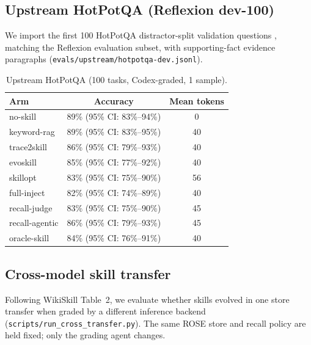 \documentclass[11pt]{article}
\begin{document}
\subsection{Upstream HotPotQA (Reflexion dev-100)}
\label{sec:hotpot}

We import the first 100 HotPotQA distractor-split validation questions \citep{yang2018hotpotqa}, matching the Reflexion evaluation subset, with supporting-fact evidence paragraphs (\texttt{evals/upstream/hotpotqa-dev.jsonl}).

\begin{table}[t]
  \centering
  \caption{Upstream HotPotQA (100 tasks, Codex-graded, 1 sample).}
  \label{tab:hotpot_upstream}
  \begin{tabular}{lcc}
    \toprule
    Arm & Accuracy & Mean tokens \\
    \midrule
    no\mbox{-}skill & 89\% (95\% CI: 83\%--94\%) & 0 \\
    keyword\mbox{-}rag & 89\% (95\% CI: 83\%--95\%) & 40 \\
    trace2skill & 86\% (95\% CI: 79\%--93\%) & 40 \\
    evoskill & 85\% (95\% CI: 77\%--92\%) & 40 \\
    skillopt & 83\% (95\% CI: 75\%--90\%) & 56 \\
    full\mbox{-}inject & 82\% (95\% CI: 74\%--89\%) & 40 \\
    recall\mbox{-}judge & 83\% (95\% CI: 75\%--90\%) & 45 \\
    recall\mbox{-}agentic & 86\% (95\% CI: 79\%--93\%) & 45 \\
    oracle\mbox{-}skill & 84\% (95\% CI: 76\%--91\%) & 40 \\
    \bottomrule
  \end{tabular}
\end{table}

\subsection{Cross-model skill transfer}
\label{sec:cross_transfer}

Following WikiSkill Table~2, we evaluate whether skills evolved in one store transfer when graded by a different inference backend (\texttt{scripts/run\_cross\_transfer.py}).
The same ROSE store and recall policy are held fixed; only the grading agent changes.
\end{document}
